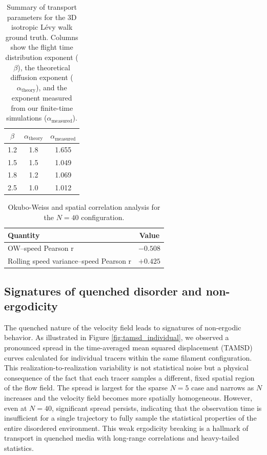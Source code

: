\documentclass[]{article}
\begin{document}
\begin{table}[h!]
\centering
\caption{Summary of transport parameters for the 3D isotropic L\'evy walk ground truth. Columns show the flight time distribution exponent ($\beta$), the theoretical diffusion exponent ($\alpha_{\text{theory}}$), and the exponent measured from our finite-time simulations ($\alpha_{\text{measured}}$).}
\label{tab:params_levy}
\begin{tabular}{ccc}
\hline
$\beta$ & $\alpha_{\text{theory}}$ & $\alpha_{\text{measured}}$ \\
\hline
1.2 & 1.8 & 1.655 \\
1.5 & 1.5 & 1.049 \\
1.8 & 1.2 & 1.069 \\
2.5 & 1.0 & 1.012 \\
\hline
\end{tabular}
\end{table}

\begin{table}[h!]
\centering
\caption{Okubo-Weiss and spatial correlation analysis for the $N=40$ configuration.}
\label{tab:params_ow}
\begin{tabular}{lc}
\hline
Quantity & Value \\
\hline
OW--speed Pearson r & $-0.508$ \\
Rolling speed variance--speed Pearson r & $+0.425$ \\
\hline
\end{tabular}
\end{table}

\subsection{Signatures of quenched disorder and non-ergodicity}

The quenched nature of the velocity field leads to signatures of non-ergodic behavior. As illustrated in Figure \ref{fig:tamsd_individual}, we observed a pronounced spread in the time-averaged mean squared displacement (TAMSD) curves calculated for individual tracers within the same filament configuration. This realization-to-realization variability is not statistical noise but a physical consequence of the fact that each tracer samples a different, fixed spatial region of the flow field. The spread is largest for the sparse $N=5$ case and narrows as $N$ increases and the velocity field becomes more spatially homogeneous. However, even at $N=40$, significant spread persists, indicating that the observation time is insufficient for a single trajectory to fully sample the statistical properties of the entire disordered environment. This weak ergodicity breaking is a hallmark of transport in quenched media with long-range correlations and heavy-tailed statistics.
\end{document}
